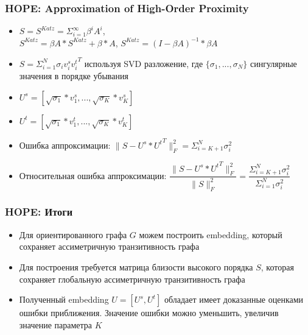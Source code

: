 \documentclass[xcolor=table,english]{beamer}
\begin{document}
\begin{frame}[fragile] \frametitle{HOPE: Approximation of High-Order Proximity}
    \begin{itemize}
        \item $S = S^{Katz} = \Sigma_{i=1}^{\infty} \beta^i A^i$, \\$S^{Katz} = \beta A * S^{Katz} + \beta * A$, $S^{Katz} = (I - \beta A)^{-1} * \beta A$
        \item $S = \Sigma_{i=1}^N \sigma_i v_i^s {v_i^t}^T$ используя SVD разложение, где $\{\sigma_1, ... , \sigma_N\}$ сингулярные значения в порядке убывания
        \item $U^s = [ \sqrt{\sigma_1} * v_1^s, ..., \sqrt{\sigma_K} * v_K^s ]$
        \item $U^t = [ \sqrt{\sigma_1} * v_1^t, ..., \sqrt{\sigma_K} * v_K^t ]$
        \item Ошибка аппроксимации: $\| S - U^s * {U^t}^T \|^2_F = \Sigma_{i=K+1}^N \sigma_i^2$
        \item Относительная ошибка аппроксимации: $\dfrac{\| S - U^s * {U^t}^T \|^2_F}{\| S \|^2_F} = \dfrac{\Sigma_{i=K+1}^N \sigma_i^2}{\Sigma_{i=1}^N \sigma_i^2}$
    \end{itemize}
\end{frame}

\begin{frame}[fragile] \frametitle{HOPE: Итоги}
    \begin{itemize}
        \item Для ориентированного графа $G$ можем построить embedding, который сохраняет ассиметричную транзитивность графа
        \item Для построения требуется матрица близости высокого порядка $S$, которая сохраняет 
        глобальную ассиметричную транзитивность графа
        \item Полученный embedding $U = [U^s, U^t]$ обладает имеет доказанные оценками ошибки приближения. Значение ошибки можно уменьшить, увеличив значение параметра $K$
    \end{itemize}
\end{frame}
\end{document}

